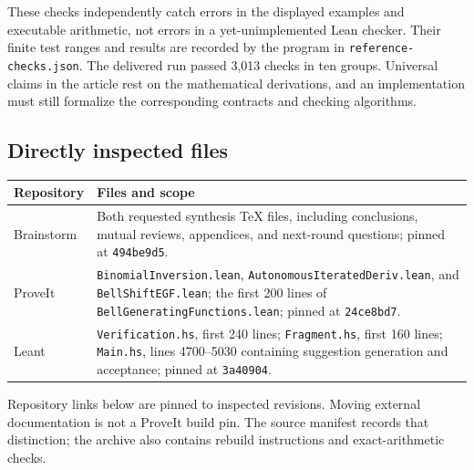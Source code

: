 \documentclass[11pt,a4paper]{article}
\newcommand{\code}[1]{\nolinkurl{#1}}
\theoremstyle{definition}
\begin{document}
These checks independently catch errors in the displayed examples and executable
arithmetic, not errors in a yet-unimplemented Lean checker. Their finite test
ranges and results are recorded by the program in \code{reference-checks.json}.
The delivered run passed 3,013 checks in ten groups.
Universal claims in the article rest on the mathematical derivations, and an
implementation must still formalize the corresponding contracts and checking
algorithms.

\subsection{Directly inspected files}
\begin{longtable}{@{}P{.25\textwidth}P{.67\textwidth}@{}}
\toprule
Repository & Files and scope\\
\midrule\endhead
Brainstorm & Both requested synthesis TeX files, including conclusions, mutual reviews, appendices, and next-round questions; pinned at \code{494be9d5}.\\
ProveIt & \code{BinomialInversion.lean}, \code{AutonomousIteratedDeriv.lean}, and \code{BellShiftEGF.lean}; the first 200 lines of \code{BellGeneratingFunctions.lean}; pinned at \code{24ce8bd7}.\\
Leant & \code{Verification.hs}, first 240 lines; \code{Fragment.hs}, first 160 lines; \code{Main.hs}, lines 4700--5030 containing suggestion generation and acceptance; pinned at \code{3a40904}.\\
\bottomrule
\end{longtable}

Repository links below are pinned to inspected revisions. Moving external
documentation is not a ProveIt build pin. The source manifest records that
distinction; the archive also contains rebuild instructions and exact-arithmetic
checks.
\end{document}
